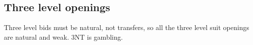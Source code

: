 \documentclass[a4paper,14pt]{extarticle}
\begin{document}
\subsection{Three level openings}

Three level bids must be natural, not transfers, so all the three level suit
openings are natural and weak. 3NT is gambling.

\newevenside

\def\thesection{\Alph{section}}
\setcounter{section}{0}

\small

\end{document}
